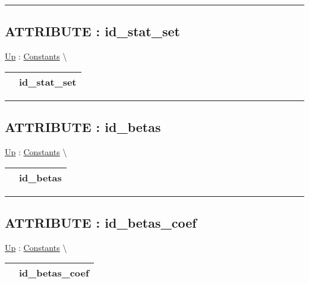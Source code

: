 \par


\rule{\linewidth}{0.5pt}
\subsection*{ATTRIBUTE : id\_stat\_set}
\hypertarget{ecldoc:logisticregression.constants.id_stat_set}{}
\hyperlink{ecldoc:LogisticRegression.Constants}{Up} :
\hspace{0pt} \hyperlink{ecldoc:LogisticRegression.Constants}{Constants} \textbackslash 

{\renewcommand{\arraystretch}{1.5}
\begin{tabularx}{\textwidth}{|>{\raggedright\arraybackslash}l|X|}
\hline
\hspace{0pt} & id\_stat\_set \\
\hline
\end{tabularx}
}

\par


\rule{\linewidth}{0.5pt}
\subsection*{ATTRIBUTE : id\_betas}
\hypertarget{ecldoc:logisticregression.constants.id_betas}{}
\hyperlink{ecldoc:LogisticRegression.Constants}{Up} :
\hspace{0pt} \hyperlink{ecldoc:LogisticRegression.Constants}{Constants} \textbackslash 

{\renewcommand{\arraystretch}{1.5}
\begin{tabularx}{\textwidth}{|>{\raggedright\arraybackslash}l|X|}
\hline
\hspace{0pt} & id\_betas \\
\hline
\end{tabularx}
}

\par


\rule{\linewidth}{0.5pt}
\subsection*{ATTRIBUTE : id\_betas\_coef}
\hypertarget{ecldoc:logisticregression.constants.id_betas_coef}{}
\hyperlink{ecldoc:LogisticRegression.Constants}{Up} :
\hspace{0pt} \hyperlink{ecldoc:LogisticRegression.Constants}{Constants} \textbackslash 

{\renewcommand{\arraystretch}{1.5}
\begin{tabularx}{\textwidth}{|>{\raggedright\arraybackslash}l|X|}
\hline
\hspace{0pt} & id\_betas\_coef \\
\hline
\end{tabularx}
}

